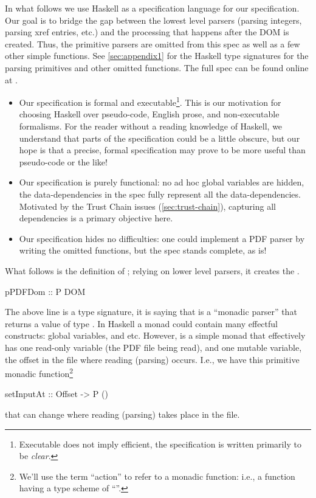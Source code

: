 In what follows we use Haskell \cite{Haskell} as a specification language for
our specification.
%
Our goal is to bridge the gap between the lowest level parsers
(parsing integers, parsing xref entries, etc.) and the processing
that happens after the DOM is created.   Thus, the primitive parsers
are omitted from this spec as well as a few other simple functions.
See \cref{sec:appendix1} for the Haskell type signatures for
the parsing primitives and other omitted functions.
The full spec can be found online at .

\begin{itemize}
\item Our specification is formal and executable\footnote{
  Executable does not imply efficient, the specification is written
  primarily to be \emph{clear}.}.
  This is our motivation for choosing Haskell over pseudo-code, English prose,
  and non-executable formalisms.  For the reader without a reading knowledge of
  Haskell, we understand that parts of the specification could be a little
  obscure, but our hope is that a precise, formal specification may prove to be
  more useful than pseudo-code or the like!
  
\item Our specification is purely functional: no ad hoc global variables are
  hidden, the data-dependencies in the spec fully represent all the
  data-dependencies.  Motivated by the Trust Chain issues
  (\cref{sec:trust-chain}), capturing all dependencies is a primary objective
  here.
  
\item Our specification hides no difficulties: one could implement a PDF parser
  by writing the omitted functions, but the spec stands complete, as is!
\end{itemize}


What follows is the definition of ; relying on lower level
parsers, it creates the .
\begin{code}
pPDFDom :: P DOM
\end{code}
The above line is a type signature, it is saying that
 is a ``monadic parser''  that returns a
value of type .
In Haskell a monad could contain many effectful constructs: global variables,
and etc. However,  is a simple monad that effectively has one
read-only variable (the PDF file being read), and one mutable variable,
the offset in the file where reading (parsing) occurs.  I.e., we have
this primitive monadic function\footnote{
  We'll use the term ``action'' to refer to a monadic function:
  i.e., a function having a type scheme of ``''.
}
\begin{codeNoExecute}
setInputAt :: Offset -> P ()
\end{codeNoExecute}
that can change where reading (parsing) takes place in the file.

